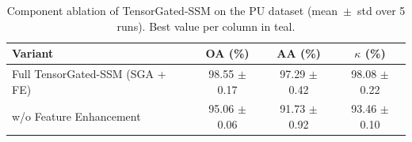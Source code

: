 \begin{table}[htbp]
  \centering
  \caption{Component ablation of TensorGated-SSM on the PU dataset (mean~$\pm$~std over 5 runs). Best value per column in \textcolor{tgteal}{teal}.}
  \label{tab:ablation_pu}
  \begin{tabular}{l c c c}
    \toprule
    Variant & OA (\%) & AA (\%) & $\kappa$ (\%) \\
    \midrule
    Full TensorGated-SSM (SGA + FE) & \textcolor{tgteal}{98.55 $\pm$ 0.17} & \textcolor{tgteal}{97.29 $\pm$ 0.42} & \textcolor{tgteal}{98.08 $\pm$ 0.22} \\
    w/o Feature Enhancement & 95.06 $\pm$ 0.06 & 91.73 $\pm$ 0.92 & 93.46 $\pm$ 0.10 \\
    \bottomrule
  \end{tabular}
\end{table}
